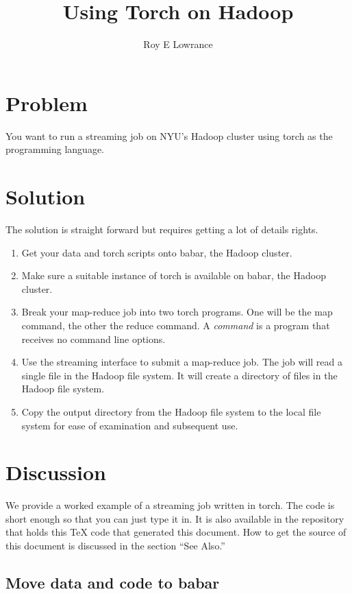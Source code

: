 \documentclass{article}
\begin{document}
\title{Using Torch on Hadoop}
\author{Roy E Lowrance}
\maketitle


\section{Problem}

You want to run a streaming job on NYU's Hadoop cluster using torch as
the programming language.

\section{Solution}

The solution is straight forward but requires getting a lot of details
rights.
\begin{enumerate}
  \item Get your data and torch scripts onto babar, the Hadoop cluster.
  \item Make sure a suitable instance of torch is available on babar,
    the Hadoop cluster.
  \item Break your map-reduce job into two torch programs. One will be
    the map command, the other the reduce command. A \emph{command} is a
    program that receives no command line options. 
  \item Use the streaming interface to submit a map-reduce job. The job
    will read a single file in the Hadoop file system. It will create a
    directory of files in the Hadoop file system.
  \item Copy the output directory from the Hadoop file system to the
    local file system for ease of examination and subsequent use.
\end{enumerate}

\section{Discussion}

We provide a worked example of a streaming job written in torch. The
code is short enough so that you can just type it in. It is also
available in the repository that holds this TeX code that generated this
document. How to get the source of this document is discussed in the
section ``See Also.''

\subsection{Move data and code to babar}
\end{document}
